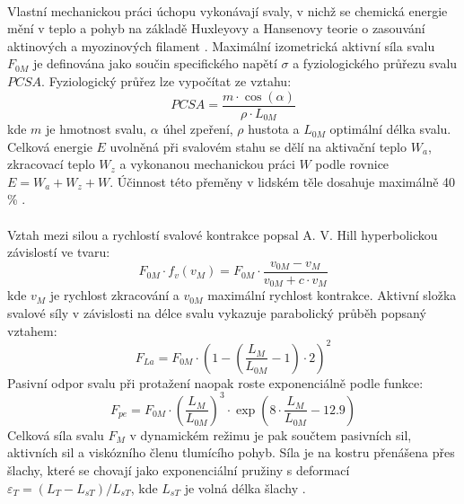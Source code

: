 \paragraph{}Vlastní mechanickou práci úchopu vykonávají svaly, v nichž se chemická energie mění v teplo a pohyb na základě Huxleyovy a Hansenovy teorie o zasouvání aktinových a myozinových filament \cite{Benes2022}. Maximální izometrická aktivní síla svalu $F_{0M}$ je definována jako součin specifického napětí $\sigma$ a fyziologického průřezu svalu $PCSA$. Fyziologický průřez lze vypočítat ze vztahu:
\begin{equation}
PCSA = \frac{m \cdot \cos(\alpha)}{\rho \cdot L_{0M}}
\end{equation}
kde $m$ je hmotnost svalu, $\alpha$ úhel zpeření, $\rho$ hustota a $L_{0M}$ optimální délka svalu. Celková energie $E$ uvolněná při svalovém stahu se dělí na aktivační teplo $W_a$, zkracovací teplo $W_z$ a vykonanou mechanickou práci $W$ podle rovnice $E = W_a + W_z + W$. Účinnost této přeměny v lidském těle dosahuje maximálně 40 \% \cite{Capek2018}.

\paragraph{}Vztah mezi silou a rychlostí svalové kontrakce popsal A. V. Hill hyperbolickou závislostí ve tvaru:
\begin{equation}
F_{0M} \cdot f_v(v_M) = F_{0M} \cdot \frac{v_{0M} - v_M}{v_{0M} + c \cdot v_M}
\end{equation}
kde $v_M$ je rychlost zkracování a $v_{0M}$ maximální rychlost kontrakce. Aktivní složka svalové síly v závislosti na délce svalu vykazuje parabolický průběh popsaný vztahem:
\begin{equation}
F_{La} = F_{0M} \cdot \left(1 - \left(\frac{L_M}{L_{0M}} - 1\right) \cdot 2\right)^2
\end{equation}
Pasivní odpor svalu při protažení naopak roste exponenciálně podle funkce:
\begin{equation}
F_{pe} = F_{0M} \cdot \left(\frac{L_M}{L_{0M}}\right)^3 \cdot \exp\left(8 \cdot \frac{L_M}{L_{0M}} - 12.9\right)
\end{equation}
Celková síla svalu $F_M$ v dynamickém režimu je pak součtem pasivních sil, aktivních sil a viskózního členu tlumícího pohyb. Síla je na kostru přenášena přes šlachy, které se chovají jako exponenciální pružiny s deformací $\varepsilon_T = (L_T - L_{sT}) / L_{sT}$, kde $L_{sT}$ je volná délka šlachy \cite{Capek2018}.

